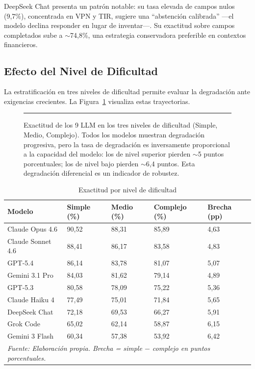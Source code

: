 \documentclass[12pt,a4paper]{article}
\begin{document}
DeepSeek Chat presenta un patrón notable: su tasa elevada de campos nulos (9,7\%), concentrada en VPN y TIR, sugiere una ``abstención calibrada'' ---el modelo declina responder en lugar de inventar---. Su exactitud sobre campos completados sube a $\sim$74,8\%, una estrategia conservadora preferible en contextos financieros.

\subsection{Efecto del Nivel de Dificultad}

La estratificación en tres niveles de dificultad permite evaluar la degradación ante exigencias crecientes. La Figura~\ref{fig:dificultad} visualiza estas trayectorias.

\begin{figure}[ht]
\centering
\rule{0.9\linewidth}{5cm}
\caption{Exactitud de los 9 LLM en los tres niveles de dificultad (Simple, Medio, Complejo). Todos los modelos muestran degradación progresiva, pero la tasa de degradación es inversamente proporcional a la capacidad del modelo: los de nivel superior pierden $\sim$5 puntos porcentuales; los de nivel bajo pierden $\sim$6,4 puntos. Esta degradación diferencial es un indicador de robustez.}
\label{fig:dificultad}
\end{figure}

\begin{table}[ht]
\centering
\caption{Exactitud por nivel de dificultad}
\label{tab:dificultad}
\begin{tabularx}{\linewidth}{lXXXX}
\toprule
\textbf{Modelo} & \textbf{Simple (\%)} & \textbf{Medio (\%)} & \textbf{Complejo (\%)} & \textbf{Brecha (pp)} \\
\midrule
Claude Opus 4.6   & 90,52 & 88,31 & 85,89 & 4,63 \\
Claude Sonnet 4.6 & 88,41 & 86,17 & 83,58 & 4,83 \\
GPT-5.4           & 86,14 & 83,78 & 81,07 & 5,07 \\
Gemini 3.1 Pro    & 84,03 & 81,62 & 79,14 & 4,89 \\
GPT-5.3           & 80,58 & 78,09 & 75,22 & 5,36 \\
Claude Haiku 4    & 77,49 & 75,01 & 71,84 & 5,65 \\
DeepSeek Chat     & 72,18 & 69,53 & 66,27 & 5,91 \\
Grok Code         & 65,02 & 62,14 & 58,87 & 6,15 \\
Gemini 3 Flash    & 60,34 & 57,38 & 53,92 & 6,42 \\
\bottomrule
\multicolumn{5}{l}{\footnotesize\textit{Fuente: Elaboración propia. Brecha = simple $-$ complejo en puntos porcentuales.}}
\end{tabularx}
\end{table}
\end{document}
